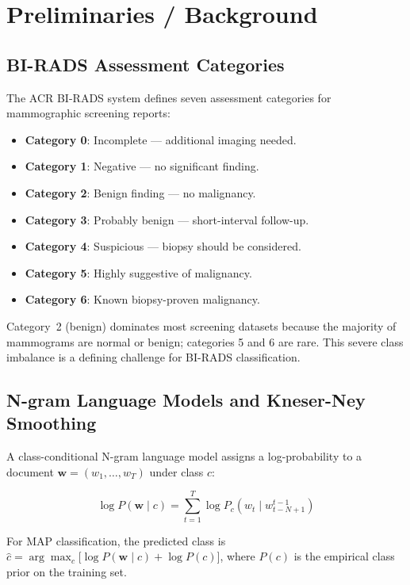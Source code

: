 \documentclass[11pt,a4paper]{article}
\begin{document}
\section{Preliminaries / Background}

\subsection{BI-RADS Assessment Categories}

The ACR BI-RADS system defines seven assessment categories for mammographic
screening reports:

\begin{itemize}
  \item \textbf{Category 0}: Incomplete --- additional imaging needed.
  \item \textbf{Category 1}: Negative --- no significant finding.
  \item \textbf{Category 2}: Benign finding --- no malignancy.
  \item \textbf{Category 3}: Probably benign --- short-interval follow-up.
  \item \textbf{Category 4}: Suspicious --- biopsy should be considered.
  \item \textbf{Category 5}: Highly suggestive of malignancy.
  \item \textbf{Category 6}: Known biopsy-proven malignancy.
\end{itemize}

Category~2 (benign) dominates most screening datasets because the majority of
mammograms are normal or benign; categories 5 and 6 are rare.
This severe class imbalance is a defining challenge for BI-RADS classification.

\subsection{N-gram Language Models and Kneser-Ney Smoothing}

A class-conditional N-gram language model assigns a log-probability to a
document $\mathbf{w} = (w_1, \ldots, w_T)$ under class $c$:

\begin{equation}
  \log P(\mathbf{w} \mid c)
  = \sum_{t=1}^{T} \log P_c(w_t \mid w_{t-N+1}^{t-1})
\end{equation}

For MAP classification, the predicted class is
$\hat{c} = \arg\max_c \bigl[\log P(\mathbf{w}\mid c) + \log P(c)\bigr]$,
where $P(c)$ is the empirical class prior on the training set.
\end{document}
